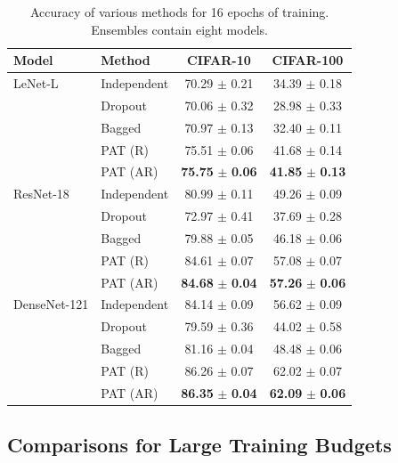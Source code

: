 \documentclass[letterpaper]{article} %
\begin{document}
\begin{table}[t]
\small

\begin{tabularx}{\columnwidth}{l X c c}
\toprule
Model & Method & CIFAR-10 & CIFAR-100 \\
\midrule
LeNet-L  & Independent & 70.29 $\pm$ 0.21 & 34.39 $\pm$ 0.18 \\
        & Dropout & 70.06 $\pm$ 0.32  & 28.98 $\pm$ 0.33 \\
        & Bagged & 70.97 $\pm$ 0.13  & 32.40 $\pm$ 0.11 \\
        & PAT (R) & 75.51 $\pm$ 0.06  & 41.68 $\pm$ 0.14 \\
        & PAT (AR) & \textbf{75.75} $\pm$ \textbf{0.06} & \textbf{41.85} $\pm$ \textbf{0.13} \\
\midrule
ResNet-18 & Independent & 80.99 $\pm$ 0.11 & 49.26 $\pm$ 0.09 \\
        & Dropout & 72.97 $\pm$ 0.41 & 37.69 $\pm$ 0.28 \\
        & Bagged & 79.88 $\pm$ 0.05 & 46.18 $\pm$ 0.06 \\
        & PAT (R) & 84.61 $\pm$ 0.07  & 57.08 $\pm$ 0.07 \\
        & PAT (AR) & \textbf{84.68} $\pm$ \textbf{0.04} & \textbf{57.26} $\pm$ \textbf{0.06} \\
\midrule
DenseNet-121 & Independent & 84.14 $\pm$ 0.09 & 56.62 $\pm$ 0.09 \\
          & Dropout & 79.59 $\pm$ 0.36 & 44.02 $\pm$ 0.58 \\
          & Bagged & 81.16 $\pm$ 0.04 & 48.48 $\pm$ 0.06 \\
          & PAT (R) & 86.26 $\pm$ 0.07  & 62.02 $\pm$ 0.07 \\
            & PAT (AR) & \textbf{86.35} $\pm$ \textbf{0.04} & \textbf{62.09} $\pm$ \textbf{0.06} \\
\bottomrule
\end{tabularx}

\caption{Accuracy of various methods for 16 epochs of training. Ensembles contain eight models.}\label{tab:low-budget-table}
\end{table}

\subsection{Comparisons for Large Training Budgets}
\end{document}
